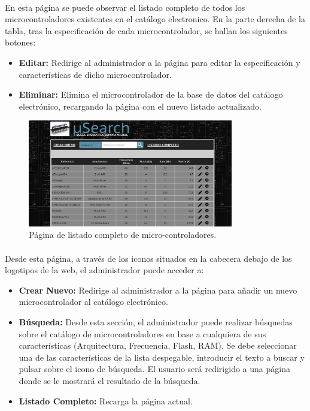 \paragraph{}En esta página se puede observar el listado completo de todos los microcontroladores existentes en el catálogo electronico. En la parte derecha de la tabla, tras la especificación de cada microcontrolador, se hallan los siguientes botones:
\begin{itemize}
	\item \textbf{Editar:} Redirige al administrador a la página para editar la especificación y características de dicho microcontrolador.
	\item \textbf{Eliminar:} Elimina el microcontrolador de la base de datos del catálogo electrónico, recargando la página con el nuevo listado actualizado.
\end{itemize}

\begin{figure}[h!]
	\centering
	\includegraphics[width=0.80\textwidth]{img/listado_completo_admin}
	\caption{Página de listado completo de micro-controladores.}
	\label{fig:listado_completo_admin}
\end{figure}

\paragraph{}Desde esta página, a través de los iconos situados en la cabecera debajo de los logotipos de la web, el administrador puede acceder a:

\begin{itemize}
	
	\item \textbf{Crear Nuevo:} Redirige al administrador a la página para añadir un nuevo microcontrolador al catálogo electrónico.
		
	\item \textbf{Búsqueda:} Desde esta sección, el administrador puede realizar búsquedas sobre el catálogo de microcontroladores en base a cualquiera de sus características (Arquitectura, Frecuencia, Flash, RAM). Se debe seleccionar una de las características de la lista despegable, introducir el texto a buscar y pulsar sobre el icono de búsqueda.
	El usuario será redirigido a una página donde se le mostrará el resultado de la búsqueda.
			
	\item \textbf{Listado Completo:} Recarga la página actual.
\end{itemize}